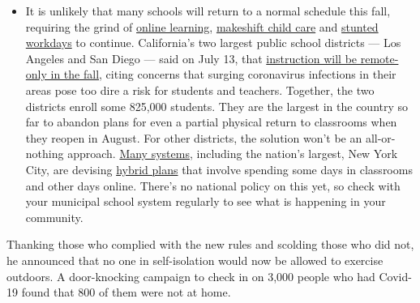 \begin{itemize}
  \begin{itemize}
  \tightlist
  \item
    It is unlikely that many schools will return to a normal schedule
    this fall, requiring the grind of
    \href{https://www.nytimes.com/2020/06/05/us/coronavirus-education-lost-learning.html?action=click\&pgtype=Article\&state=default\&region=MAIN_CONTENT_3\&context=storylines_faq}{online
    learning},
    \href{https://www.nytimes.com/2020/05/29/us/coronavirus-child-care-centers.html?action=click\&pgtype=Article\&state=default\&region=MAIN_CONTENT_3\&context=storylines_faq}{makeshift
    child care} and
    \href{https://www.nytimes.com/2020/06/03/business/economy/coronavirus-working-women.html?action=click\&pgtype=Article\&state=default\&region=MAIN_CONTENT_3\&context=storylines_faq}{stunted
    workdays} to continue. California's two largest public school
    districts --- Los Angeles and San Diego --- said on July 13, that
    \href{https://www.nytimes.com/2020/07/13/us/lausd-san-diego-school-reopening.html?action=click\&pgtype=Article\&state=default\&region=MAIN_CONTENT_3\&context=storylines_faq}{instruction
    will be remote-only in the fall}, citing concerns that surging
    coronavirus infections in their areas pose too dire a risk for
    students and teachers. Together, the two districts enroll some
    825,000 students. They are the largest in the country so far to
    abandon plans for even a partial physical return to classrooms when
    they reopen in August. For other districts, the solution won't be an
    all-or-nothing approach.
    \href{https://bioethics.jhu.edu/research-and-outreach/projects/eschool-initiative/school-policy-tracker/}{Many
    systems}, including the nation's largest, New York City, are
    devising
    \href{https://www.nytimes.com/2020/06/26/us/coronavirus-schools-reopen-fall.html?action=click\&pgtype=Article\&state=default\&region=MAIN_CONTENT_3\&context=storylines_faq}{hybrid
    plans} that involve spending some days in classrooms and other days
    online. There's no national policy on this yet, so check with your
    municipal school system regularly to see what is happening in your
    community.
  \end{itemize}
\end{itemize}

Thanking those who complied with the new rules and scolding those who
did not, he announced that no one in self-isolation would now be allowed
to exercise outdoors. A door-knocking campaign to check in on 3,000
people who had Covid-19 found that 800 of them were not at home.

